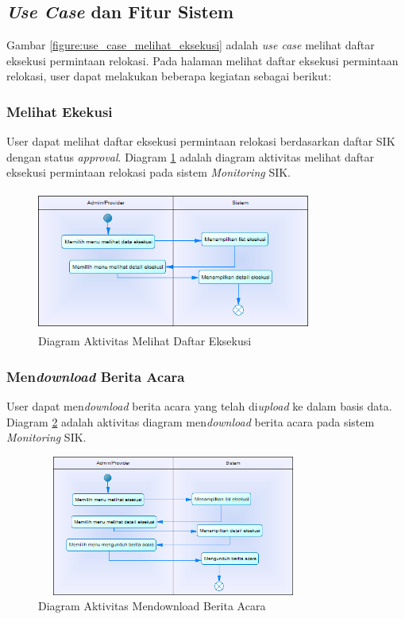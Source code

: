 \subsection{\textit{Use Case} dan Fitur Sistem}
Gambar \ref{figure:use_case_melihat_eksekusi} adalah \textit{use case} melihat daftar eksekusi permintaan relokasi. Pada halaman melihat daftar eksekusi permintaan relokasi, user dapat melakukan beberapa kegiatan sebagai berikut:
	\subsubsection{Melihat Ekekusi}
	User dapat melihat daftar eksekusi permintaan relokasi berdasarkan daftar SIK dengan status \textit{approval}. Diagram \ref{figure:activity_melihat_eksekusi} adalah diagram aktivitas melihat daftar eksekusi permintaan relokasi pada sistem \textit{Monitoring} SIK.
	\begin{figure}[h]
	\centerline {\includegraphics[width=9cm,height=4.6cm]{bab4/ActivityDiagram_MelihatEksekusi.png}}
	\caption{Diagram Aktivitas Melihat Daftar Eksekusi}
	\label{figure:activity_melihat_eksekusi}
	\end{figure}
	
	\subsubsection{Men\textit{download} Berita Acara}
	User dapat men\textit{download} berita acara yang telah di\textit{upload} ke dalam basis data. Diagram \ref{figure:activity_mendownload_berita_acara} adalah aktivitas diagram men\textit{download} berita acara pada sistem \textit{Monitoring} SIK.
	\begin{figure}[h]
	\centerline
	{\includegraphics[width=9cm,height=4.6cm]{bab4/ActivityDiagram_DownloadBeritaAcara.png}}
	\caption{Diagram Aktivitas Mendownload Berita Acara}
	\label{figure:activity_mendownload_berita_acara}
	\end{figure}
	

